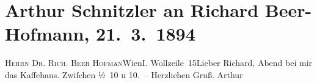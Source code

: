 

         
         \renewcommand{\erwaehntePersonen}{Personen: Richard Beer-Hofmann}
         \renewcommand{\erwaehnteOrte}{Orte: I., Innere Stadt, Wien, Wollzeile}
         \renewcommand{\erwaehnteWerke}{}
               \section[Arthur Schnitzler an Richard Beer-Hofmann, 21. 3. 1894]{ Arthur Schnitzler an Richard Beer-Hofmann, 21. 3. 1894}\nopagebreak{}\rehead{ }\begin{ledgroupsized}[t]{13cm}\normalsize\beginnumbering \toendnotes[C]{\smallbreak\pagebreak[2]} 
\toendnotes[C]{\smallbreak}\pstart{}{\pb}\textsc{Herrn Dr. Rich. Beer Hofman}\pend{}\pstart{}Wien\pend{}\pstart{}I. Wollzeile 15\pend{}{\bigskip}\pstart{}{\pb}Lieber Richard,\pend\pstart
           \label{K_L00306-1v}\label{K_L00306-1h}{ }Abend bei mir das Kaffehaus.\pend
           \pstart
           Zwiſchen ½ 10 u 10. –\pend
           \pstart Herzlichen Gruß. \spacefill\mbox{Arthur}\pend{}
         
         \endnumbering{}\end{ledgroupsized}  \newcommand{\dateiname}{L00306}\newcommand{\titel}{Arthur Schnitzler an Richard Beer-Hofmann, 21. 3. 1894}\newcommand{\editorInnen}{Martin Anton Müller und Gerd-Hermann Susen}
      